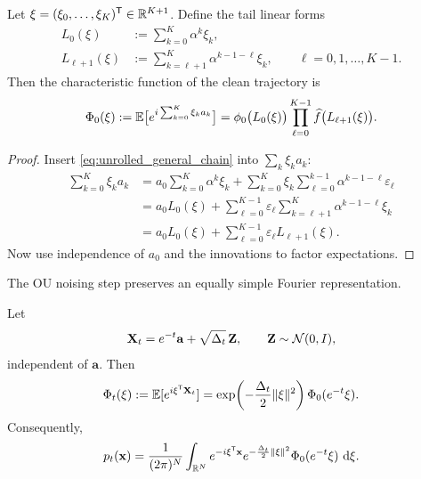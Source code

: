 \documentclass[11pt]{article}
\begin{document}
\begin{theorem}\label{thm:char_function_general}
Let $\xi=(\xi_0,\dots,\xi_K)^{\mathsf{T}}\in\mathbb{R}^{K+1}$. Define the tail linear forms
\begin{align}
 L_0(\xi)&:=\sum_{k=0}^K\alpha^k\xi_k, \\
 L_{\ell+1}(\xi)&:=\sum_{k=\ell+1}^K\alpha^{k-1-\ell}\xi_k,
 \qquad \ell=0,1,\dots,K-1.
\end{align}
Then the characteristic function of the clean trajectory is
\begin{equation}\label{eq:general_char_clean}
 \Phi_0(\xi)
 :=\mathbb{E}\big[e^{i\sum_{k=0}^K\xi_ka_k}\big]
 =\phi_0\big(L_0(\xi)\big)
 \prod_{\ell=0}^{K-1}\widehat f\big(L_{\ell+1}(\xi)\big).
\end{equation}
\end{theorem}

\begin{proof}
Insert \eqref{eq:unrolled_general_chain} into $\sum_k\xi_ka_k$:
\begin{align}
 \sum_{k=0}^K\xi_ka_k
 &=a_0\sum_{k=0}^K\alpha^k\xi_k
 +\sum_{k=0}^K\xi_k\sum_{\ell=0}^{k-1}\alpha^{k-1-\ell}\varepsilon_\ell \\
 &=a_0L_0(\xi)+\sum_{\ell=0}^{K-1}\varepsilon_\ell\sum_{k=\ell+1}^K\alpha^{k-1-\ell}\xi_k \\
 &=a_0L_0(\xi)+\sum_{\ell=0}^{K-1}\varepsilon_\ell L_{\ell+1}(\xi).
\end{align}
Now use independence of $a_0$ and the innovations to factor expectations.
\end{proof}

The OU noising step preserves an equally simple Fourier representation.

\begin{proposition}\label{prop:char_function_noisy}
Let
\begin{equation}
 \mathbf X_t=e^{-t}\mathbf a+\sqrt{\Delta_t}\,\mathbf Z,
 \qquad \mathbf Z\sim\mathcal{N}(0,I),
\end{equation}
independent of $\mathbf a$. Then
\begin{equation}\label{eq:char_noisy_general}
 \Phi_t(\xi)
 :=\mathbb{E}[e^{i\xi^{\mathsf{T}}\mathbf X_t}]
 =\exp\!\left(-\frac{\Delta_t}{2}\lVert \xi\rVert^2\right)
 \Phi_0(e^{-t}\xi).
\end{equation}
Consequently,
\begin{equation}\label{eq:inverse_fourier_general}
 p_t(\mathbf x)=\frac{1}{(2\pi)^N}
 \int_{\mathbb{R}^N}
 e^{-i\xi^{\mathsf{T}}\mathbf x}
 e^{-\frac{\Delta_t}{2}\lVert \xi\rVert^2}
 \Phi_0(e^{-t}\xi)
 \,\,\mathrm{d}\xi.
\end{equation}
\end{proposition}
\end{document}
